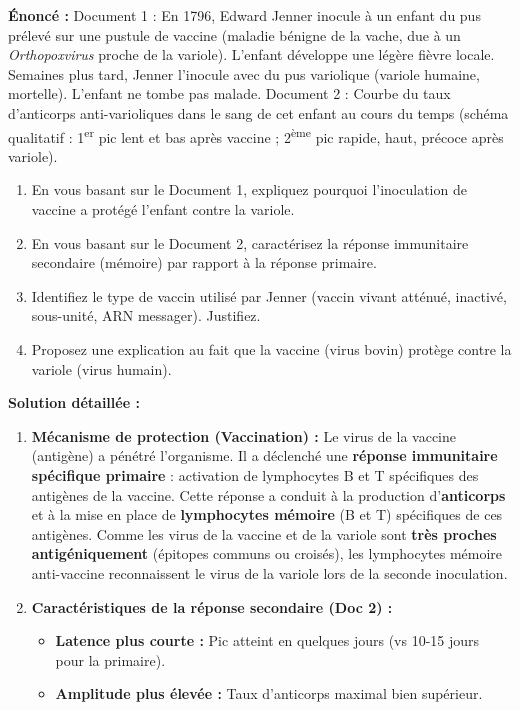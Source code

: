 \documentclass[11pt]{article}
\begin{document}
\begin{exoresolu}
\textbf{Énoncé :} Document 1 : En 1796, Edward Jenner inocule à un enfant du pus prélevé sur une pustule de vaccine (maladie bénigne de la vache, due à un \emph{Orthopoxvirus} proche de la variole). L'enfant développe une légère fièvre locale. Semaines plus tard, Jenner l'inocule avec du pus variolique (variole humaine, mortelle). L'enfant ne tombe pas malade.
Document 2 : Courbe du taux d'anticorps anti-varioliques dans le sang de cet enfant au cours du temps (schéma qualitatif : 1\textsuperscript{er} pic lent et bas après vaccine ; 2\textsuperscript{ème} pic rapide, haut, précoce après variole).
\begin{enumerate}
 \item En vous basant sur le Document 1, expliquez pourquoi l'inoculation de vaccine a protégé l'enfant contre la variole.
 \item En vous basant sur le Document 2, caractérisez la réponse immunitaire secondaire (mémoire) par rapport à la réponse primaire.
 \item Identifiez le type de vaccin utilisé par Jenner (vaccin vivant atténué, inactivé, sous-unité, ARN messager). Justifiez.
 \item Proposez une explication au fait que la vaccine (virus bovin) protège contre la variole (virus humain).
\end{enumerate}
\tcblower
\textbf{Solution détaillée :}
\begin{enumerate}
 \item \textbf{Mécanisme de protection (Vaccination) :} Le virus de la vaccine (antigène) a pénétré l'organisme. Il a déclenché une \textbf{réponse immunitaire spécifique primaire} : activation de lymphocytes B et T spécifiques des antigènes de la vaccine. Cette réponse a conduit à la production d'\textbf{anticorps} et à la mise en place de \textbf{lymphocytes mémoire} (B et T) spécifiques de ces antigènes. Comme les virus de la vaccine et de la variole sont \textbf{très proches antigéniquement} (épitopes communs ou croisés), les lymphocytes mémoire anti-vaccine reconnaissent le virus de la variole lors de la seconde inoculation.
 \item \textbf{Caractéristiques de la réponse secondaire (Doc 2) :}
 \begin{itemize}
 \item \textbf{Latence plus courte :} Pic atteint en quelques jours (vs 10-15 jours pour la primaire).
 \item \textbf{Amplitude plus élevée :} Taux d'anticorps maximal bien supérieur.

\end{itemize}
\end{enumerate}
\end{exoresolu}
\end{document}
